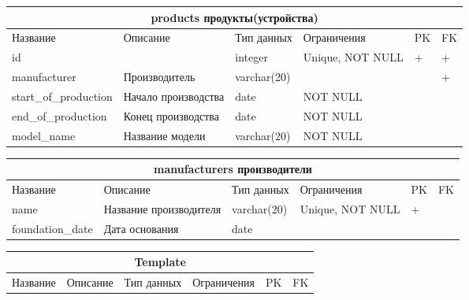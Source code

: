 \documentclass{article}
\begin{document}
\begin{tabular}{ |p{3.5cm}|p{3cm}|p{3cm}|p{3cm}|p{2cm}|p{2cm}|  }
\hline
\multicolumn{6}{|c|}{products продукты(устройства)} \\
\hline
Название & Описание & Тип данных & Ограничения & PK & FK\\
\hline
id                     &   %
                       &   %
integer                &   %
Unique, NOT NULL       &   %
 +                     &   %
 +                     \\  %
\hline
manufacturer           &   %
Производитель          &   %
varchar(20)            &   %
                       &   %
                       &   %
 +                     \\  %
\hline
start\_of\_production  &   %
Начало производства    &   %
date                   &   %
NOT NULL               &   %
                       &   %
                       \\  %
\hline
end\_of\_production    &   %
Конец производства     &   %
date                   &   %
NOT NULL               &   %
                       &   %
                       \\  %
\hline
model\_name            &   %
Название модели        &   %
varchar(20)            &   %
NOT NULL               &   %
                       &   %
                       \\  %
\hline
\end{tabular}

\begin{tabular}{ |p{3.5cm}|p{3cm}|p{3cm}|p{3cm}|p{2cm}|p{2cm}| }
\hline
\multicolumn{6}{|c|}{manufacturers производители} \\
\hline
Название & Описание & Тип данных & Ограничения & PK & FK\\
\hline
name                   &   %
Название производителя &   %
varchar(20)            &   %
Unique, NOT NULL       &   %
 +                     &   %
                       \\  %
\hline
foundation\_date       &   %
Дата основания         &   %
date                   &   %
                       &   %
                       &   %
                       \\  %
\hline
\end{tabular}


\newpage

\begin{tabular}{ |p{3.5cm}|p{3cm}|p{3cm}|p{3cm}|p{2cm}|p{2cm}| }
\hline
\multicolumn{6}{|c|}{Template} \\
\hline
Название & Описание & Тип данных & Ограничения & PK & FK\\
\hline
\end{tabular}
\end{document}
